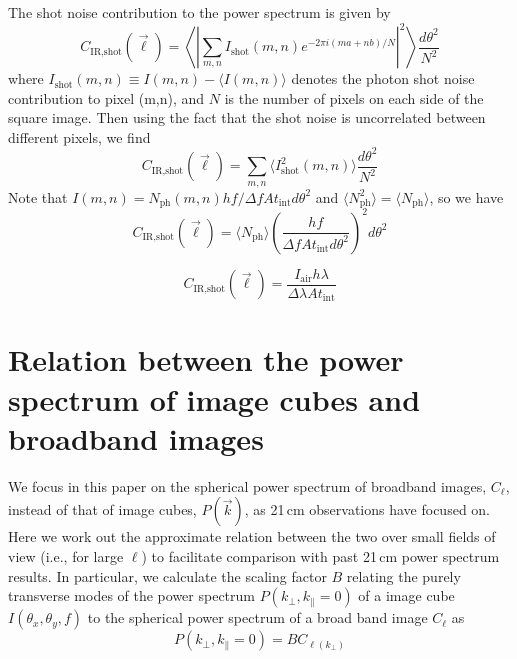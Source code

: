\documentclass{emulateapj}
\newcommand{\IR}{\text{IR}}
\newcommand{\shot}{\text{shot}}
\begin{document}
The shot noise contribution to the power spectrum is given by
\begin{equation}
C_{\IR, \shot}(\vec{\ell}) = \left\langle\left|\sum_{m,n}I_\shot(m,n)e^{-2\pi i(ma+nb)/N}\right|^2\right\rangle \frac{d\theta^2}{N^2}
\end{equation}
where $I_\shot(m,n)\equiv I(m,n)-\langle I(m,n)\rangle$ denotes the photon shot noise contribution to pixel (m,n), and $N$ is the number of pixels on each side of the square image. Then using the fact that the shot noise is uncorrelated between different pixels, we find
\begin{equation}
C_{\IR, \shot}(\vec{\ell}) = \sum_{m,n}\langle I^2_\shot(m,n)\rangle \frac{d\theta^2}{N^2}
\end{equation}
Note that $I(m,n)=N_\text{ph}(m,n)hf/\Delta f A t_\text{int}d\theta^2$ and $\langle N_\text{ph}^2\rangle = \langle N_\text{ph}\rangle$, so we have
\begin{equation}
C_{\IR, \shot}(\vec{\ell}) = \langle N_\text{ph}\rangle \left(\frac{hf}{\Delta f A t_\text{int}d\theta^2}\right)^2 d\theta^2
\end{equation}

\begin{equation}
C_{\IR, \shot}(\vec{\ell}) =\frac{I_\text{air}h\lambda}{\Delta \lambda A t_\text{int}}
\end{equation}

\section{Relation between the power spectrum of image cubes and broadband images}
\label{sec:pspecrelation}

We focus in this paper on the spherical power spectrum of broadband images, $C_\ell$,  instead of that of image cubes, $P(\vec{k})$, as 21\,cm observations have focused on. Here we work out the approximate relation between the two over small fields of view (i.e., for large $\ell$) to facilitate comparison with past 21\,cm power spectrum results. In particular, we calculate the scaling factor $B$ relating the purely transverse modes of the power spectrum $P(k_\perp,k_\parallel=0)$ of a image cube $I(\theta_x,\theta_y,f)$ to the spherical power spectrum of a broad band image $C_\ell$ as
\begin{equation}
P(k_\perp,k_\parallel=0) = B C_{\ell(k_\perp)}
\end{equation}
\end{document}
